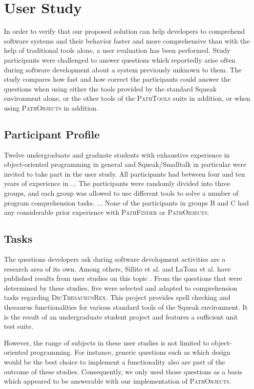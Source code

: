 \clearpage
\section{User Study}
\label{s:DiscussionEvaluation}
In order to verify that our proposed solution can help developers to comprehend software systems and their behavior faster and more comprehensive than with the help of traditional tools alone, a user evaluation has been performed.
Study participants were challenged to answer questions which reportedly arise often during software development about a system previously unknown to them.
The study compares how fast and how correct the participants could answer the questions  when using either the tools provided by the standard Squeak environment alone, or the other tools of the \textsc{PathTools} suite in addition, or when using \textsc{PathObjects} in addition.

\subsection{Participant Profile}
Twelve undergraduate and graduate students with exhaustive experience in object-oriented programming in general and Squeak/Smalltalk in particular were invited to take part in the user study.
All participants had between four and ten years of experience in ...
The participants were randomly divided into three groups, and each group was allowed to use different tools to solve a number of program comprehension tasks.
...
None of the participants in groups B and C had any considerable prior experience with \textsc{PathFinder} or \textsc{PathObjects}.

\subsection{Tasks}
The questions developers ask during software development activities are a research area of its own.
Among others, Sillito et al. and LaToza et al. have published results from user studies on this topic \cite{sillito_asking_2008, latoza_hard--answer_2010}.
From the questions that were determined by these studies, five were selected and adapted to comprehension tasks regarding \textsc{DicThesaurusRex}.
This project provides spell checking and thesaurus functionalities for various standard tools of the Squeak environment.
It is the result of an undergraduate student project and features a sufficient unit test suite.

However, the range of subjects in these user studies is not limited to object-oriented programming.
For instance, generic questions such as which design would be the best choice to implement a functionality also are part of the outcome of these studies.
Consequently, we only used those questions as a basis which appeared to be answerable with our implementation of \textsc{PathObjects}.

